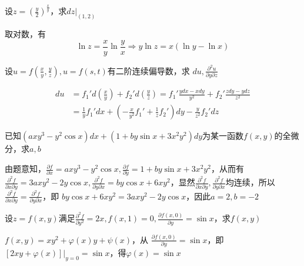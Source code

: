 \documentclass{article}
\begin{document}
\begin{examplle}[]
设\(z=(\frac{y}{2})^{\frac{x}{y}}\)，求\(dz\Big\rvert_{(1,2)}\)

取对数，有
\begin{equation*}
\ln z=\frac{x}{y}\ln\frac{y}{x}\Rightarrow
y\ln z=x(\ln y-\ln x)
\end{equation*}
\end{examplle}


\begin{examplle}[]
设\(u=f(\frac{x}{y},\frac{y}{z}),u=f(s,t)\)有二阶连续偏导数，求
\(du,\frac{\partial^2 u}{\partial y\partial z}\)

\begin{align*}
du&=f_1'd(\frac{x}{y})+f_2'd(\frac{y}{z})=f_1'\frac{ydx-xdy}{y^2}
+f_2'\frac{zdy-ydz}{z^2}\\
&=\frac{1}{y}f_1'dx+(-\frac{x}{y^2}f_1'+\frac{1}{z}f_2')dy-\frac{y}{z^2}f_2'dz
\end{align*}
\end{examplle}

\begin{examplle}[]
已知\((axy^3-y^2\cos x)dx+(1+by\sin x+3x^2y^2)dy\)为某一函数\(f(x,y)\)的全微
分，求\(a,b\)

由题意知，\(\frac{\partial f}{\partial x}=axy^3-y^2\cos x,\frac{\partial f}{\partial y}=1+by\sin
   x+3x^2y^2\)，从而有
\(\frac{\partial ^2f}{\partial x\partial y}=3axy^2-2y\cos x,\frac{\partial^2f}{\partial y\partial
   x}=by\cos x+6xy^2\)，显然\(\frac{\partial^2f}{\partial x\partial y},\frac{\partial^2f}{\partial y\partial
   x}\)均连续，所以\(\frac{\partial^2f}{\partial x\partial y}=\frac{\partial^2f}{\partial y\partial x}\)，即
\(by\cos x+6xy^2=3axy^2-2y\cos x\)，因此\(a=2,b=-2\)
\end{examplle}

\begin{examplle}[]
设\(z=f(x,y)\)满足\(\frac{\partial^2f}{\partial y^2}=2x,f(x,1)=0,\frac{\partial f(x,0)}{\partial y}=\sin
   x\)，求\(f(x,y)\)

\(f(x,y)=xy^2+\varphi(x)y+\psi(x)\)，从
\(\frac{\partial f(x,0)}{\partial y}=\sin x\)，即\([2xy+\varphi(x)]\Big\rvert_{y=0}=\sin
   x\)，得\(\varphi(x)=\sin x\)
\end{examplle}
\end{document}
